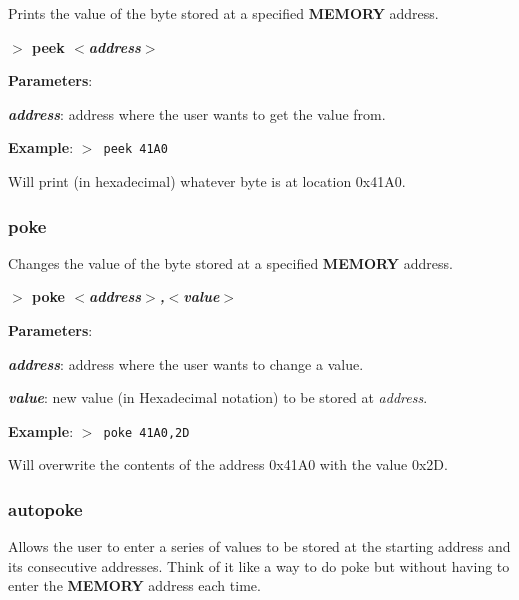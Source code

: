         Prints the value of the byte stored at a specified \textbf{MEMORY}
        address.

        \hspace{1.9cm}\textbf{$>$ peek \textit{$<$address$>$}}

        \textbf{Parameters}:

        \hspace{1cm}\textbf{\textit{address}}: address where the user wants
        to get the value from.

        \textbf{Example}: \texttt{$>$ peek 41A0}

        Will print (in hexadecimal) whatever byte is at location 0x41A0.

        \subsubsection{{poke}}
        \label{cmd:poke}

        Changes the value of the byte stored at a specified \textbf{MEMORY}
        address.

        \hspace{1.9cm}\textbf{$>$ poke \textit{$<$address$>$,$<$value$>$}}

        \textbf{Parameters}:

        \hspace{1cm}\textbf{\textit{address}}: address where the user wants
        to change a value.
        
        \hspace{1cm}\textbf{\textit{value}}: new value (in Hexadecimal notation)
        to be stored at \textit{address}.

        \textbf{Example}: \texttt{$>$ poke 41A0,2D}

        Will overwrite the contents of the address 0x41A0 with the value
        0x2D.

        \subsubsection{{autopoke}}
        Allows the user to enter a series of values to be stored at the
        starting address and its consecutive addresses. Think of it like a
        way to do poke but without having to enter the \textbf{MEMORY}
        address each time.


